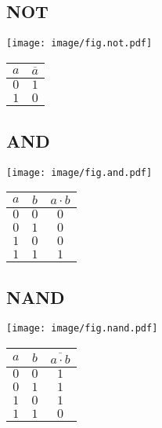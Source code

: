 
\subsection*{NOT}
\begin{minipage}[t][2em][c]{\linewidth}
	\centering
	\texttt{[image: image/fig.not.pdf]}
\end{minipage}
\begin{center}
	\begin{tabular}{c|c}
		\toprule
		$a$ & $\overline{a}$ \\
		\midrule
		$0$ & $1$            \\
		$1$ & $0$            \\
		\bottomrule
	\end{tabular}
\end{center}

\newcolumn

\subsection*{AND}

\begin{minipage}[t][2em][c]{\linewidth}
	\centering
	\texttt{[image: image/fig.and.pdf]}
\end{minipage}
\begin{center}
	\begin{tabular}{cc|c}
		\toprule
		$a$ & $b$ & $a\cdot b$ \\
		\midrule
		$0$ & $0$ & $0$        \\
		$0$ & $1$ & $0$        \\
		$1$ & $0$ & $0$        \\
		$1$ & $1$ & $1$        \\
		\bottomrule
	\end{tabular}
\end{center}

\subsection*{NAND}
\begin{minipage}[t][2em][c]{\linewidth}
	\centering
	\texttt{[image: image/fig.nand.pdf]}
\end{minipage}
\begin{center}
	\begin{tabular}{cc|c}
		\toprule
		$a$ & $b$ & $\overline{a\cdot b}$ \\
		\midrule
		$0$ & $0$ & $1$                   \\
		$0$ & $1$ & $1$                   \\
		$1$ & $0$ & $1$                   \\
		$1$ & $1$ & $0$                   \\
		\bottomrule
	\end{tabular}
\end{center}

